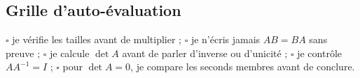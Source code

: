 \subsection{Grille d'auto-évaluation}
$\square$ je vérifie les tailles avant de multiplier ; $\square$ je n'écris jamais $AB=BA$ sans preuve ; $\square$ je calcule $\det A$ avant de parler d'inverse ou d'unicité ; $\square$ je contrôle $AA^{-1}=I$ ; $\square$ pour $\det A=0$, je compare les seconds membres avant de conclure.
